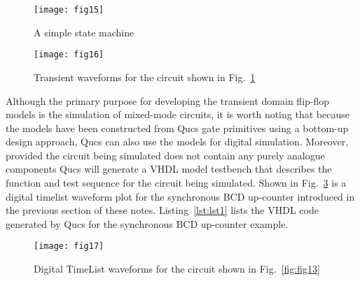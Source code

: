 \begin{figure}[ht]
  \centering
	\texttt{[image: fig15]}
        \caption{A simple state machine}
        \label{fig:fig15}
\end{figure} 

\begin{figure}[ht]
  \centering
  \texttt{[image: fig16]}
  \caption{Transient waveforms for the circuit shown in Fig.~\ref{fig:fig15}}
  \label{fig:fig16}
\end{figure}

Although the primary purpose for developing the transient domain
flip-flop models is the simulation of mixed-mode circuits, it is worth
noting that because the models have been constructed from Qucs gate
primitives using a bottom-up design approach, Qucs can also use the
models for digital simulation.  Moreover, provided the circuit being
simulated does not contain any purely analogue components Qucs will
generate a VHDL model testbench that describes the function and test
sequence for the circuit being simulated.  Shown in
Fig.~\ref{fig:fig17} is a digital timelist waveform plot for the
synchronous BCD up-counter introduced in the previous section of these
notes.  Listing~\ref{lst:lst1} lists the VHDL code generated by Qucs for
the synchronous BCD up-counter example.


\begin{figure}[ht]
  \centering
	\texttt{[image: fig17]}
        \caption{Digital TimeList waveforms for the circuit shown in Fig.~\ref{fig:fig13}}
        \label{fig:fig17}
\end{figure} 

